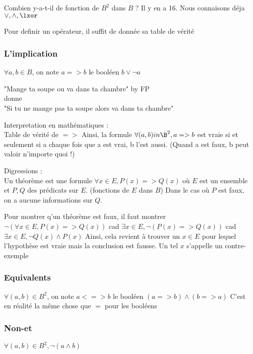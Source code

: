 Combien y-a-t-il de fonction de $B^2$ dans $B$ ?
Il y en a 16. Nous connaisons déja $\lor,\land,\lxor$

Pour definir un opérateur, il suffit de donnée sa table de vérité

\subsubsection{L'implication}
\begin{def}
    $\forall a,b \in B$, on note $a=>b$ le booléen $b\lor\lnot a$
\end{def}

\begin{ex}
    "Mange ta soupe ou va dans ta chambre"  by FP\\
    donne \\
    "Si tu ne mange pas ta soupe alors va dans ta chambre"\\
\end{ex}

Interpretation en mathématiques :\\
Table de vérité de $=>$
Ainsi, la formule $\forall (a,b) in \B^2, a => b$ est vraie si et seulement si a chaque fois que a est vrai, b l'est aussi. (Quand a est faux, b peut valoir n'importe quoi !)

Digressions : \\
Un théorème est une formule $\forall x \in E, P(x) => Q(x)$ où $E$ est un ensemble et $P,Q$ des prédicats sur $E$. (fonctions de $E$ dans $B$)
Dans le cas où $P$ est faux, on a aucune informations sur $Q$. 

Pour montrer q'un théorème est faux, il faut montrer
$\lnot(\forall x \in E, P(x) => Q(x))$ cad $\exists x \in E, \lnot(P(x) => Q(x))$ cad $\exists x \in E, \lnot Q(x) \land P(x)$
Ainsi, cela revient à trouver un $x\in E$ pour lequel l'hypothèse est vraie mais la conclusion est fausse. Un tel $x$ s'appelle un contre-exemple

\subsubsection{Equivalents}
\begin{def}
    $\forall (a,b) \in B^2$, on note $a<=>b$ le booléen $(a=>b) \land (b=>a)$
    C'est en réalité la même chose que $=$ pour les booléens
\end{def}

\subsubsection{Non-et}
\begin{def}
    $\forall (a,b) \in B^2,\lnot(a\land b)$ 
\end{def}

